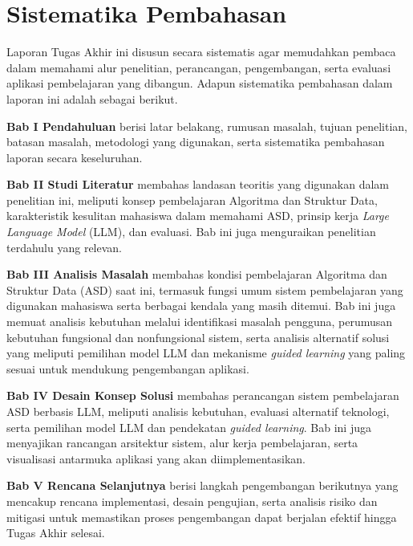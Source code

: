 \section{Sistematika Pembahasan}

Laporan Tugas Akhir ini disusun secara sistematis agar memudahkan pembaca dalam memahami alur penelitian, perancangan, pengembangan, serta evaluasi aplikasi pembelajaran yang dibangun. Adapun sistematika pembahasan dalam laporan ini adalah sebagai berikut.

\textbf{Bab I Pendahuluan} berisi latar belakang, rumusan masalah, tujuan penelitian, batasan masalah, metodologi yang digunakan, serta sistematika pembahasan laporan secara keseluruhan.

\textbf{Bab II Studi Literatur} membahas landasan teoritis yang digunakan dalam penelitian ini, meliputi konsep pembelajaran Algoritma dan Struktur Data, karakteristik kesulitan mahasiswa dalam memahami ASD, prinsip kerja \textit{Large Language Model} (LLM), dan evaluasi. Bab ini juga menguraikan penelitian terdahulu yang relevan.

\textbf{Bab III Analisis Masalah} membahas kondisi pembelajaran Algoritma dan Struktur Data (ASD) saat ini, termasuk fungsi umum sistem pembelajaran yang digunakan mahasiswa serta berbagai kendala yang masih ditemui. Bab ini juga memuat analisis kebutuhan melalui identifikasi masalah pengguna, perumusan kebutuhan fungsional dan nonfungsional sistem, serta analisis alternatif solusi yang meliputi pemilihan model LLM dan mekanisme \textit{guided learning} yang paling sesuai untuk mendukung pengembangan aplikasi.

\textbf{Bab IV Desain Konsep Solusi} membahas perancangan sistem pembelajaran ASD berbasis LLM, meliputi analisis kebutuhan, evaluasi alternatif teknologi, serta pemilihan model LLM dan pendekatan \textit{guided learning}. Bab ini juga menyajikan rancangan arsitektur sistem, alur kerja pembelajaran, serta visualisasi antarmuka aplikasi yang akan diimplementasikan.

\textbf{Bab V Rencana Selanjutnya} berisi langkah pengembangan berikutnya yang mencakup rencana implementasi, desain pengujian, serta analisis risiko dan mitigasi untuk memastikan proses pengembangan dapat berjalan efektif hingga Tugas Akhir selesai.


